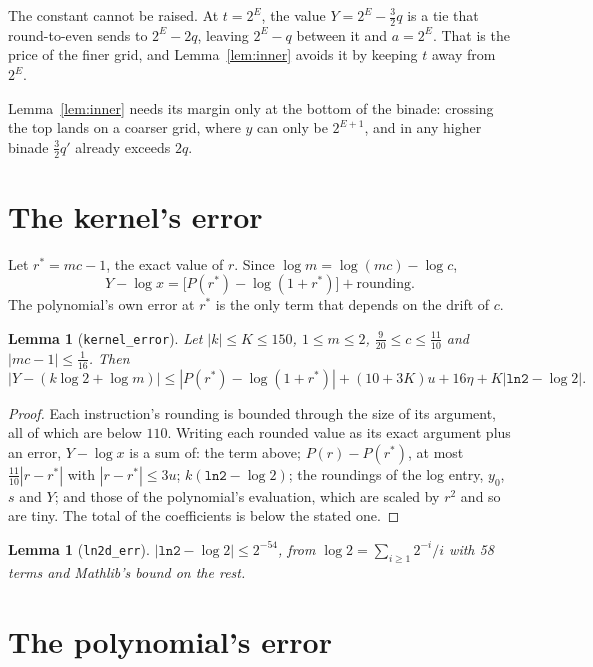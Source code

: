 \documentclass[11pt]{article}
\newtheorem{lemma}[theorem]{Lemma}
\newcommand{\lean}[1]{{\small\texttt{#1}}}
\begin{document}
The constant cannot be raised. At $t = 2^E$, the value $Y = 2^E - \tfrac32 q$ is a tie that
round-to-even sends to $2^E - 2q$, leaving $2^E - q$ between it and $a = 2^E$. That is the
price of the finer grid, and Lemma~\ref{lem:inner} avoids it by keeping $t$ away from $2^E$.

Lemma~\ref{lem:inner} needs its margin only at the bottom of the binade: crossing the
top lands on a coarser grid, where $y$ can only be $2^{E+1}$, and in any higher binade
$\tfrac32 q'$ already exceeds $2q$.

\section{The kernel's error}\label{sec:error}

Let $r^* = m c - 1$, the exact value of $r$. Since $\log m = \log(mc) - \log c$,
\[
  Y - \log x = \bigl[P(r^*) - \log(1 + r^*)\bigr] + \text{rounding}.
\]
The polynomial's own error at $r^*$ is the only term that depends on the drift of $c$.

\begin{lemma}[\lean{kernel\_error}]\label{lem:error}
Let $|k| \le K \le 150$, $1 \le m \le 2$, $\tfrac{9}{20} \le c \le \tfrac{11}{10}$ and
$|mc - 1| \le \tfrac1{16}$. Then
\[
  |Y - (k \log 2 + \log m)| \le |P(r^*) - \log(1 + r^*)|
    + (10 + 3K)u + 16\eta + K|\mathtt{ln2} - \log 2|.
\]
\end{lemma}

\begin{proof}
Each instruction's rounding is bounded through the size of its argument, all of which are
below $110$. Writing each rounded value as its exact argument plus an error, $Y - \log x$
is a sum of: the term above; $P(r) - P(r^*)$, at most $\tfrac{11}{10}|r - r^*|$ with
$|r - r^*| \le 3u$; $k(\mathtt{ln2} - \log 2)$; the roundings of the log entry, $y_0$, $s$
and $Y$; and those of the polynomial's evaluation, which are scaled by $r^2$ and so are
tiny. The total of the coefficients is below the stated one.
\end{proof}

\begin{lemma}[\lean{ln2d\_err}]
$|\mathtt{ln2} - \log 2| \le 2^{-54}$, from
$\log 2 = \sum_{i \ge 1} 2^{-i}/i$ with 58 terms and Mathlib's bound on the rest.
\end{lemma}

\section{The polynomial's error}\label{sec:poly}
\end{document}
